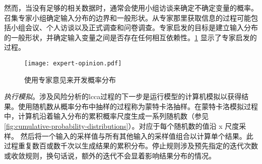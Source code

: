 然而，当没有足够的相关数据时，通常会使用小组访谈来确定不确定变量的概率。召集专家小组确定输入分布的边界和一般形状。从专家那里获取信息的过程可能包括小组会议、个人访谈以及正式调查和问卷调查。专家启发的目标是建立输入分布的一般形状，并确定输入变量之间是否存在任何相互依赖性。\cref{fig:expert-opinion} 显示了专家启发的过程。

\begin{figure}
  \texttt{[image: expert-opinion.pdf]}
  \caption{使用专家意见来开发概率分布}
  \label{fig:expert-opinion}
\end{figure}

\emph{执行模拟}。涉及风险分析的\acrlong*{lcca}过程的下一步是运行模型的计算机模拟以获得结果。使用随机数从概率分布中抽样的过程称为蒙特卡洛抽样。在蒙特卡洛模拟过程中，计算机沿着输入分布的累积概率尺度生成一系列随机数（参见 \cref{fig:cumulative-probability-distributions}）。对应于每个随机数的值沿 x 尺度采样。 然后将一个输入的采样值与所有其他输入的采样值组合以计算单个结果。此过程重复数百或数千次以生成结果的累积分布。停止规则涉及预先指定的迭代次数或收敛规则，换句话说，额外的迭代不会显着影响结果分布的情况。


